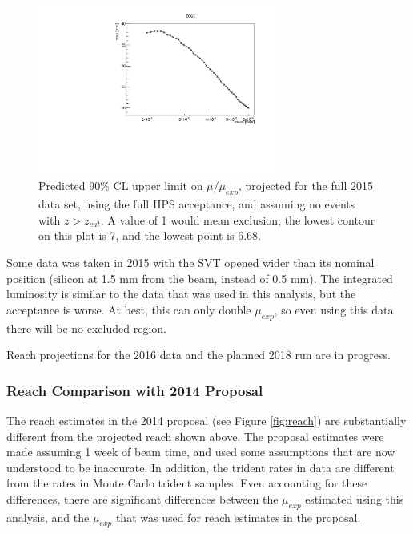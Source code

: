 \begin{figure}[ht]
\begin{center}
    \includegraphics[width=0.7\textwidth,page=15,angle=-90]{vertexing/figs/golden_fullset_mres_allayers_nosignal_output}
\end{center}
\caption{Predicted 90\% CL upper limit on $\mu/\mu_{exp}$, projected for the full 2015 data set, using the full HPS acceptance, and assuming no events with $z>z_{cut}$. A value of 1 would mean exclusion; the lowest contour on this plot is 7, and the lowest point is 6.68.}
    \label{fig:upper_limit_fullset_alllayers}
\end{figure}

Some data was taken in 2015 with the SVT opened wider than its nominal position (silicon at 1.5 mm from the beam, instead of 0.5 mm).
The integrated luminosity is similar to the data that was used in this analysis, but the acceptance is worse.
At best, this can only double $\mu_{exp}$, so even using this data there will be no excluded region.

Reach projections for the 2016 data and the planned 2018 run are in progress.

\subsubsection{Reach Comparison with 2014 Proposal}
\label{sec:proposal_reach}
The reach estimates in the 2014 proposal (see Figure \ref{fig:reach}) are substantially different from the projected reach shown above.
The proposal estimates were made assuming 1 week of beam time, and used some assumptions that are now understood to be inaccurate.
In addition, the trident rates in data are different from the rates in Monte Carlo trident samples.
Even accounting for these differences, there are significant differences between the $\mu_{exp}$ estimated using this analysis, and the $\mu_{exp}$ that was used for reach estimates in the proposal.

